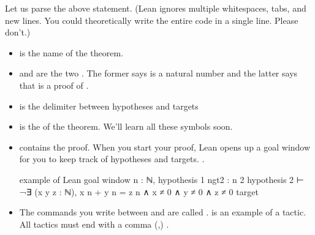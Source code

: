 \documentclass[letterpaper,10pt,english]{sphinxmanual}
\begin{document}
\sphinxAtStartPar
Let us parse the above statement. (Lean ignores multiple whitespaces, tabs, and new lines.
You could theoretically write the entire code in a single line. Please don’t.)
\begin{itemize}
\item {} 
\sphinxAtStartPar
{} is the name of the theorem.

\item {} 
\sphinxAtStartPar
{} and  are the two .
The former says  is a natural number and the latter says that  is a proof of .

\item {} 
\sphinxAtStartPar
\sphinxcode{\sphinxupquote{:}} is the delimiter between hypotheses and targets

\item {} 
\sphinxAtStartPar
{} is the  of the theorem.
We’ll learn all these symbols soon.

\item {} 
\sphinxAtStartPar
{} contains the proof. When you start your proof, Lean opens up a goal window  for you to keep track of hypotheses and targets.
.

\begin{sphinxVerbatim}[commandchars=\\\{\}]
\PYGZhy{}\PYGZhy{} example of Lean goal window
n : ℕ, \PYGZhy{}\PYGZhy{} hypothesis 1
n\PYGZus{}gt\PYGZus{}2 : n \PYGZgt{} 2 \PYGZhy{}\PYGZhy{} hypothesis 2
⊢ ¬∃ (x y z : ℕ), x \PYGZca{} n + y \PYGZca{} n = z \PYGZca{} n ∧ x ≠ 0 ∧ y ≠ 0 ∧ z ≠ 0 \PYGZhy{}\PYGZhy{} target
\end{sphinxVerbatim}

\item {} 
\sphinxAtStartPar
The commands you write between  and  are called .
 is an example of a tactic.
 All tactics must end with a comma (,) .

\end{itemize}
\end{document}
